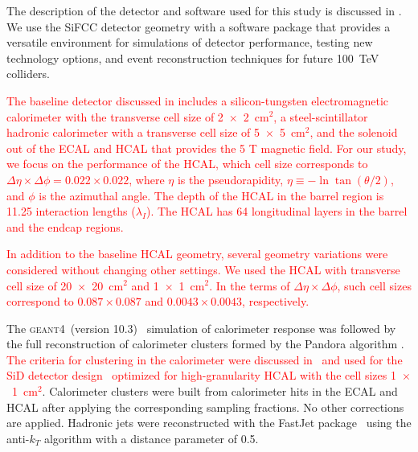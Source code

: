 \documentclass[final,1p,11pt]{elsarticle}
\newcommand{\GEANTfour} {\textsc{geant4}}
\begin{document}
The description of the detector and software used for this study is discussed in \cite{Chekanov:2016ppq}.
We use the SiFCC detector geometry with a software package that provides a versatile environment for simulations
of detector performance, testing new technology options, and event reconstruction techniques for future
100~TeV colliders.


\textcolor{red}{The baseline detector discussed in \cite{Chekanov:2016ppq}
includes a silicon-tungsten electromagnetic calorimeter with the transverse cell size of 2~$\times$~2~cm$^2$, a steel-scintillator hadronic calorimeter with a transverse cell size of 5~$\times$~5~cm$^2$, and the solenoid out of the ECAL and HCAL that provides the 5 T magnetic field. For our study, we focus on the performance of the HCAL,
which cell size corresponds to $\Delta \eta \times \Delta \phi = 0.022\times0.022$,
where $\eta$ is the pseudorapidity,
$\eta \equiv -\ln\tan(\theta/2)$, and $\phi$ is the azimuthal angle.
The depth of the HCAL
in the barrel region is 11.25 interaction lengths ($\lambda_I$).
The HCAL has 64 longitudinal layers in the barrel and the endcap regions.}

\textcolor{red}{In addition to the baseline HCAL geometry,
several geometry variations were considered without changing other settings.
We used the HCAL with transverse cell size of
20~$\times$~20~cm$^2$ and  1~$\times$~1~cm$^2$.
In the terms of $\Delta \eta \times \Delta \phi$,  such cell sizes correspond to
$0.087\times0.087$ and  $0.0043\times0.0043$, respectively.}

The \GEANTfour\ (version 10.3)~\cite{Allison2016186} simulation of calorimeter response was followed by the full reconstruction of calorimeter clusters formed by the Pandora algorithm \cite{Charles:2009ta,Marshall:2013bda}. \textcolor{red}{The criteria for clustering in the calorimeter were discussed in~\cite{THOMSON200925} and used for the SiD detector design~\cite{Behnke:2013lya} optimized for high-granularity HCAL with the cell sizes 1~$\times$~1~cm$^2$}.
Calorimeter clusters were built from calorimeter hits in the  ECAL and HCAL after applying the corresponding sampling fractions. No other corrections are applied.
Hadronic jets were 
reconstructed with the {\sc FastJet} package~\cite{fastjet} using the anti-$k_T$ algorithm \cite{Cacciari:2008gp}
with  a distance parameter of 0.5. 
\end{document}
